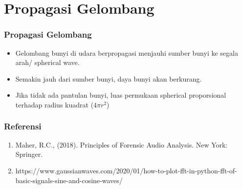 \documentclass[pdflatex,compress]{beamer}
\begin{document}
\section{Propagasi Gelombang}
\begin{frame}
	\frametitle{Propagasi Gelombang}
	\begin{itemize}
		\item Gelombang bunyi di udara berpropagasi menjauhi sumber bunyi ke segala arah/ spherical wave.
		\item Semakin jauh dari sumber bunyi, daya bunyi akan berkurang.
		\item Jika tidak ada pantulan bunyi, luas permukaan spherical proporsional terhadap radius kuadrat ($ 4\pi r^2 $)
	\end{itemize}
\end{frame}

\begin{frame}
	\frametitle{Referensi}
	\begin{enumerate}
		\item Maher, R.C., (2018). Principles of Forensic Audio Analysis. New York: Springer.
		\item https://www.gaussianwaves.com/2020/01/how-to-plot-fft-in-python-fft-of-basic-signals-sine-and-cosine-waves/
	\end{enumerate}
\end{frame}
\end{document}
